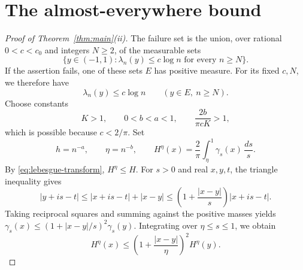 \documentclass[11pt]{article}
\theoremstyle{remark}
\numberwithin{equation}{section}
\begin{document}
\section{The almost-everywhere bound}\label{sec:ae}

\begin{proof}[Proof of Theorem~\ref{thm:main}(ii)]
The failure set is the union, over rational \(0<c<c_0\) and integers
\(N\ge2\), of the measurable sets
\[
 \{y\in(-1,1):\lambda_n(y)\le c\log n\text{ for every }n\ge N\}.
\]
If the assertion fails, one of these sets \(E\) has positive measure.
For its fixed \(c,N\), we therefore have
\begin{equation}\label{eq:common-low-set}
 \lambda_n(y)\le c\log n\qquad(y\in E,\ n\ge N).
\end{equation}
Choose constants
\[
 K>1,\qquad 0<b<a<1,\qquad \frac{2b}{\pi cK}>1,
\]
which is possible because \(c<2/\pi\). Set
\[
 h=n^{-a},\qquad\eta=n^{-b},\qquad
 H^\eta(x)=\frac2\pi\int_\eta^1\gamma_s(x)\,\frac{ds}{s}.
\]
By \eqref{eq:lebesgue-transform}, \(H^\eta\le H\). For \(s>0\)
and real \(x,y,t\), the triangle inequality gives
\[
 |y+is-t|\le |x+is-t|+|x-y|
 \le\left(1+\frac{|x-y|}{s}\right)|x+is-t|.
\]
Taking reciprocal squares and summing against the positive masses yields
\(\gamma_s(x)\le(1+|x-y|/s)^2\gamma_s(y)\). Integrating over
\(\eta\le s\le1\), we obtain
\begin{equation}\label{eq:potential-comparison}
 H^\eta(x)\le\left(1+\frac{|x-y|}{\eta}\right)^2H^\eta(y).
\end{equation}


\end{proof}
\end{document}
